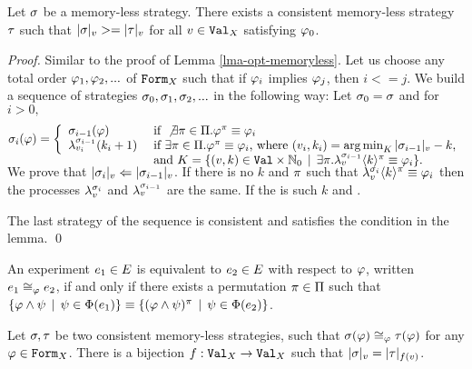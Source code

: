 \begin{lemma}
Let $\sigma$ be a memory-less strategy.
There exists a consistent memory-less strategy $\tau$ such that
  $|\sigma|_{v} >= |\tau|_{v}$
  for all $v\in\mathtt{Val}_X$ satisfying $\varphi_0$.
\end{lemma}

\begin{proof}
Similar to the proof of Lemma \ref{lma-opt-memoryless}.
Let us choose any total order $\varphi_1, \varphi_2, ...$ of $\mathtt{Form}_X$ such that
if $\varphi_i$ implies $\varphi_j$, then $i <= j$.
We build a sequence of strategies $\sigma_0, \sigma_1, \sigma_2, ...$ in the following way:
Let $\sigma_0 = \sigma$ and for $i > 0,$
\begin{equation}
\stg_i(\form) = \left\{
 \begin{array}{lll}
 \stg_{i-1}(\form) & \textrm{ if } \not\exists\perm\in\symg.\form^\perm\equiv\form_i \\
 \procstg{\stg_{i-1}}{\val_i}(k_i + 1) &
    \textrm{ if } \exists\perm\in\symg.\form^\perm\equiv\form_i\textrm{, where }
    (v_i, k_i) = \argmin_K \stglen{\stg_{i-1}}{v} - k,\\
    & \textrm{ and }
    K = \{(v, k)\in\Val\times\Nseto \| \exists\perm.\stgknow{\stg_{i-1}}{v}{k}^\perm\equiv\form_i\}.
    \vspace{-2.5ex}
 \end{array}
 \right.
 \vspace{2.5ex}
\end{equation}
We prove that $|\sigma_{i}|_{v} <= |\sigma_{i-1}|_{v}$.
If there is no $k$ and $\pi$ such that $\lambda^{\sigma_i}_{v}\langle k\rangle^\pi\equiv\varphi_i$ then
  the processes $\lambda^{\sigma_i}_{v}$ and $\lambda^{\sigma_{i-1}}_{v}$ are the same.
If the is such $k$ and .

The last strategy of the sequence is consistent and satisfies the
  condition in the lemma. \qed
\end{proof}

\begin{definition}
An experiment $e_1\in E$ is equivalent to $e_2\in E$ with respect to $\varphi$,
  written $e_1\cong_{\varphi}e_2$,
  if and only if there exists a permutation $\pi\in\Pi$ such that
 $ \{ \varphi\wedge\psi \:\:|\:\: \psi\in\Phi(e_1) \} \equiv
   \{ (\varphi\wedge\psi)^\pi \:\:|\:\: \psi\in\Phi(e_2) \} $.
\end{definition}

\begin{theorem}
Let $\sigma, \tau$ be two consistent memory-less strategies, such that
$\sigma(\varphi) \cong_{\varphi} \tau(\varphi)$ for any $\varphi\in\mathtt{Form}_X$.
There is a bijection $f:\mathtt{Val}_X -> \mathtt{Val}_X$ such that
$|\sigma|_{v} = |\tau|_{f(v)}$.
\end{theorem}


